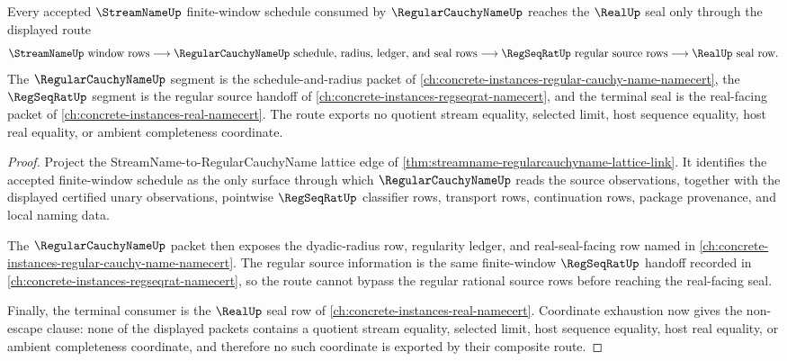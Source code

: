 \begin{theorem}
\label{thm:streamname-real-seal-lattice-link}
Every accepted $\StreamNameUp$ finite-window schedule consumed by $\RegularCauchyNameUp$ reaches the $\RealUp$ seal only through the displayed route
$$
\StreamNameUp\ \text{window rows}
\longrightarrow
\RegularCauchyNameUp\ \text{schedule, radius, ledger, and seal rows}
\longrightarrow
\RegSeqRatUp\ \text{regular source rows}
\longrightarrow
\RealUp\ \text{seal row}.
$$
The $\RegularCauchyNameUp$ segment is the schedule-and-radius packet of \autoref{ch:concrete-instances-regular-cauchy-name-namecert}, the $\RegSeqRatUp$ segment is the regular source handoff of \autoref{ch:concrete-instances-regseqrat-namecert}, and the terminal seal is the real-facing packet of \autoref{ch:concrete-instances-real-namecert}. The route exports no quotient stream equality, selected limit, host sequence equality, host real equality, or ambient completeness coordinate.
\end{theorem}
\begin{proof}
Project the StreamName-to-RegularCauchyName lattice edge of \autoref{thm:streamname-regularcauchyname-lattice-link}. It identifies the accepted finite-window schedule as the only surface through which $\RegularCauchyNameUp$ reads the source observations, together with the displayed certified unary observations, pointwise $\RegSeqRatUp$ classifier rows, transport rows, continuation rows, package provenance, and local naming data.

The $\RegularCauchyNameUp$ packet then exposes the dyadic-radius row, regularity ledger, and real-seal-facing row named in \autoref{ch:concrete-instances-regular-cauchy-name-namecert}. The regular source information is the same finite-window $\RegSeqRatUp$ handoff recorded in \autoref{ch:concrete-instances-regseqrat-namecert}, so the route cannot bypass the regular rational source rows before reaching the real-facing seal.

Finally, the terminal consumer is the $\RealUp$ seal row of \autoref{ch:concrete-instances-real-namecert}. Coordinate exhaustion now gives the non-escape clause: none of the displayed packets contains a quotient stream equality, selected limit, host sequence equality, host real equality, or ambient completeness coordinate, and therefore no such coordinate is exported by their composite route.
\end{proof}

